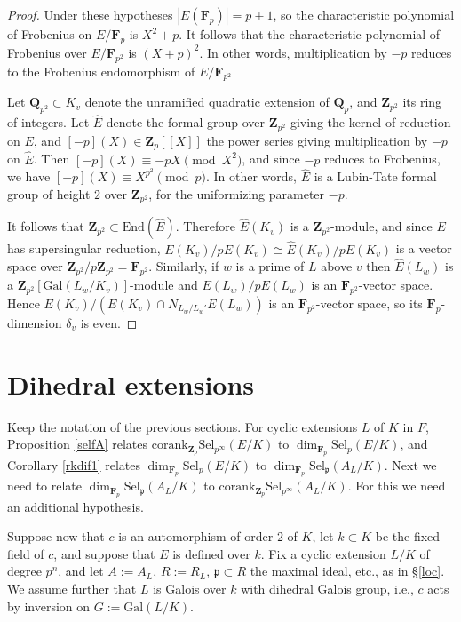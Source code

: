 \documentclass[reqno]{amsart}
\theoremstyle{definition}
\def\Z{\mathbf{Z}}
\def\Q{\mathbf{Q}}
\def\F{\mathbf{F}}
\def\Zp{\Z_p}
\def\Qp{\Q_p}
\def\Fp{\F_p}
\def\p{\mathfrak{p}}
\def\P{\mathfrak{p}}
\def\Gal{\mathrm{Gal}}
\def\cork{\mathrm{corank}}
\def\End{\mathrm{End}}
\def\Sel{\mathrm{Sel}}
\def\Ehat{\hat{E}}
\def\Qpp{\Q_{p^2}}
\def\Zpp{\Z_{p^2}}
\def\k{k}
\def\rf{\Fp}
\begin{document}
\begin{proof}
Under these hypotheses $|E(\Fp)| = p+1$, so the characteristic polynomial 
of Frobenius on $E/\Fp$ is $X^2 + p$.  It follows that the 
characteristic polynomial of Frobenius over $E/\F_{p^2}$ is $(X+p)^2$.  In other 
words, multiplication by $-p$ reduces to the Frobenius endomorphism of 
$E/\F_{p^2}$

Let $\Qpp \subset K_v$ denote the unramified quadratic extension of $\Qp$, 
and $\Zpp$ its ring of integers.
Let $\Ehat$ denote the formal group over $\Zpp$ giving the kernel of 
reduction on $E$, and $[-p](X) \in \Zp[[X]]$ the power series giving 
multiplication by $-p$ on $\Ehat$.  Then $[-p](X) \equiv -pX \pmod{X^2}$, 
and since $-p$ reduces to Frobenius, we have $[-p](X) \equiv X^{p^2} \pmod{p}$.  
In other words, $\Ehat$ is a Lubin-Tate formal group of height $2$ over $\Zpp$, 
for the uniformizing parameter $-p$.

It follows that $\Zpp \subset \End(\Ehat)$.  Therefore $\Ehat(K_v)$ is a 
$\Zpp$-module, and since $E$ has supersingular reduction,  
$E(K_v)/pE(K_v) \cong \Ehat(K_v)/p\Ehat(K_v)$ is a vector space over 
$\Zpp/p\Zpp = \F_{p^2}$.  
Similarly, if $w$ is a prime of $L$ above $v$ then $\Ehat(L_w)$ is 
a $\Zpp[\Gal(L_w/K_v)]$-module and $E(L_w)/pE(L_w)$ is an $\F_{p^2}$-vector space.  
Hence  
$E(K_v)/(E(K_v) \cap N_{L_w/L_w'}E(L_w))$ is an $\F_{p^2}$-vector space, so 
its $\Fp$-dimension $\delta_v$ is even.
\end{proof}


\section{Dihedral extensions}
\label{diex}

Keep the notation of the previous sections.  
For cyclic extensions $L$ of $K$ in $F$, 
Proposition \ref{selfA} relates $\cork_{\Zp}\Sel_{p^\infty}(E/K)$ to 
$\dim_{\rf}\Sel_p(E/K)$, and 
Corollary \ref{rkdif1} relates $\dim_{\rf}\Sel_p(E/K)$ to $\dim_{\rf}\Sel_\P(A_L/K)$.   
Next we need to relate $\dim_{\rf}\Sel_\P(A_L/K)$ to 
$\cork_{\Zp}\Sel_{p^\infty}(A_L/K)$.
For this we need an additional hypothesis.

Suppose now that $c$ is an automorphism of order $2$ of $K$, let 
$\k \subset K$ be the fixed field of $c$, and suppose that $E$ is defined 
over $\k$.  Fix a cyclic extension $L/K$ of degree $p^n$, and let $A := A_L$, 
$R := R_L$, $\p \subset R$ the maximal ideal, 
etc., as in \S\ref{loc}.  We assume further that $L$ is Galois over $k$ with dihedral Galois 
group, i.e., $c$ acts by inversion on $G := \Gal(L/K)$.
\end{document}
